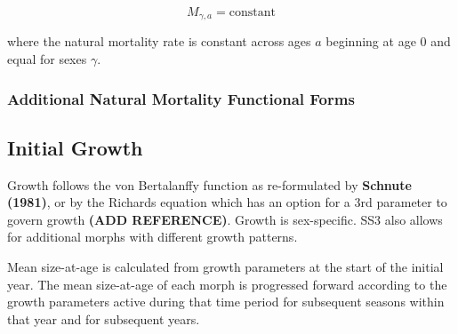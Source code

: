 \documentclass[11pt,
  english,
  letterpaper,
]{article}
\begin{document}
\begin{equation}
\label{eqn4}
M_{\gamma, a} = \text{constant}
\end{equation}

\leavevmode\tagmcend\tagstructend\par


where the natural mortality rate is constant across ages {\(a\)\leavevmode\tagmcend\tagstructend} beginning at age 0 and equal for sexes {\(\gamma\)\leavevmode\tagmcend\tagstructend}.

\leavevmode\tagmcend\tagstructend\par


\hypertarget{additional-natural-mortality-functional-forms}{%
\subsubsection{Additional Natural Mortality Functional Forms}\label{additional-natural-mortality-functional-forms}}

\leavevmode\tagmcend\tagstructend


\hypertarget{initial-growth}{%
\subsection{Initial Growth}\label{initial-growth}}

\leavevmode\tagmcend\tagstructend


Growth follows the von Bertalanffy function as re-formulated by \textbf{Schnute (1981)}, or by the Richards equation which has an option for a 3rd parameter to govern growth \textbf{(ADD REFERENCE)}. Growth is sex-specific. SS3 also allows for additional morphs with different growth patterns.

\leavevmode\tagmcend\tagstructend\par


Mean size-at-age is calculated from growth parameters at the start of the initial year. The mean size-at-age of each morph is progressed forward according to the growth parameters active during that time period for subsequent seasons within that year and for subsequent years.
\end{document}
